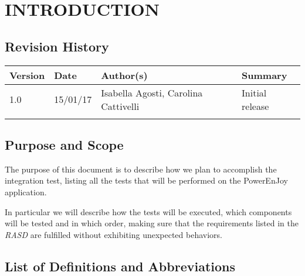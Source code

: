 \section{INTRODUCTION}
\subsection{Revision History}
 \begin{table}[h]
 	\centering
 	\begin{tabular}{| m{1.5cm} | m{1.6cm} | m{6.4cm} | m{2.5cm} |}
 		\hline
 		\textbf{Version} & \textbf{Date} & \textbf{Author(s)} & \textbf{Summary}\\
 		\hline
 		1.0 & 15/01/17 & Isabella Agosti, Carolina Cattivelli & Initial release\\
 		\hline
 		&&&\\
 		\hline
 	\end{tabular}
 \end{table}

\subsection{Purpose and Scope}
The purpose of this document is to describe how we plan to accomplish the integration test, listing all the tests that will be performed on the PowerEnJoy application.

In particular we will describe how the tests will be executed, which components will be tested and in which order, making sure that the requirements listed in the \textit{RASD} are fulfilled without exhibiting unexpected behaviors.  
\newpage
\subsection{List of Definitions and Abbreviations}
